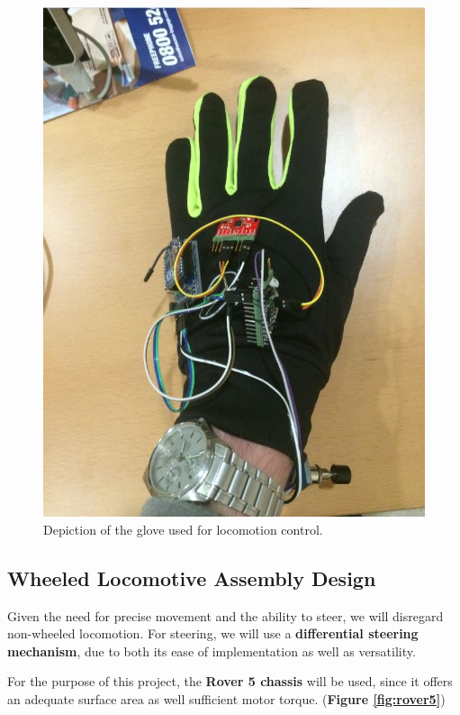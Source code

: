\documentclass[12p,a4paper]{report}
\begin{document}
\begin{figure}[H]
\begin{center}
\includegraphics[scale=0.50]{glove_component_low}
\caption{Depiction of the glove used for locomotion control.}
\label{fig:glove_component}
\end{center}
\end{figure}

\subsection{Wheeled Locomotive Assembly Design}

Given the need for precise movement and the ability to steer, we will disregard non-wheeled locomotion. For steering, we will use a \textbf{differential steering mechanism}, due to both its ease of implementation as well as versatility.

For the purpose of this project, the \textbf{Rover 5 chassis} will be used, since it offers an adequate surface area as well sufficient motor torque. (\textbf{Figure \ref{fig:rover5}})
\end{document}
